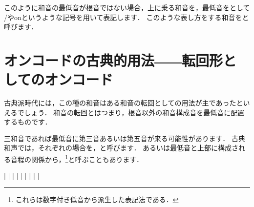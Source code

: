 \documentclass[dvipdfmx,uplatex,b5paper,openany,jbase=12Q,nomag*,textwidth-limit=44%
               ]{gachimuchi}[2020/05/05]
\begin{document}
このように和音の最低音が根音ではない場合，上に乗る和音を\txCirc ，最低音を\txSqr として
\txCirc/\txSqr や\txCirc on\txSqr というような記号を用いて表記します．
このような表し方をする和音をと呼びます．

\section{オンコードの古典的用法――転回形としてのオンコード}
古典派時代には，この種の和音はある和音の転回としての用法が主であったといえるでしょう．
和音の転回とはつまり，根音以外の和音構成音を最低音に配置するものです．

三和音であれば最低音に第三音あるいは第五音が来る可能性があります．
古典和声では，それぞれの場合を，と呼びます．
あるいは最低音と上部に構成される音程の関係から，\footnote{%
  これらは数字付き低音から派生した表記法である．
}と呼ぶこともあります．

\begin{Music}[0.5\linewidth]
  \Startpiece
  \znotes|\en%
  \NOTes%
  |%
  \en%
  \NOTes|\sk\en%
  \NOTes|\sk\en%
  \bar%
  \znotes|\en%
  \NOTes%
  |%
  \en%
  \NOTes|\sk\en%
  \NOTes|\sk\en%
  \endpiece
\end{Music}
\end{document}
